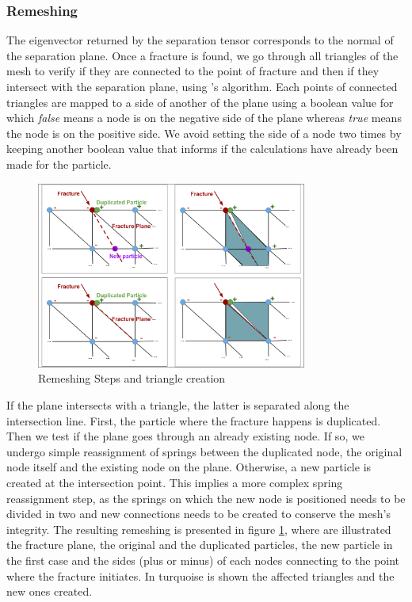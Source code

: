 \documentclass[tog]{acmsiggraph}
\begin{document}
\subsubsection{Remeshing}
The eigenvector returned by the separation tensor corresponds to the normal of the separation plane. Once a fracture is found, we go through all triangles of the mesh to verify if they are connected to the point of fracture and then if they intersect with the separation plane, using \cite{Inters}'s algorithm. Each points of connected triangles are mapped to a side of another of the plane using a boolean value for which \textit{false} means a node is on the negative side of the plane whereas \textit{true} means the node is on the positive side. We avoid setting the side of a node two times by keeping another boolean value that informs if the calculations have already been made for the particle. 

\begin{figure}[ht]
  \centering
  \includegraphics[width=3.5in]{images/fractures}
  \caption{Remeshing Steps and triangle creation}
  \label{fig:remeshing}
\end{figure}

If the plane intersects with a triangle, the latter is separated along the intersection line. First, the particle where the fracture happens is duplicated. Then we test if the plane goes through an already existing node. If so, we undergo simple reassignment of springs between the duplicated node, the original node itself and the existing node on the plane. Otherwise, a new particle is created at the intersection point. This implies a more complex spring reassignment step, as the springs on which the new node is positioned needs to be divided in two and new connections needs to be created to conserve the mesh's integrity. The resulting remeshing is presented in figure \ref{fig:remeshing}, where are illustrated the fracture plane, the original and the duplicated particles, the new particle in the first case and the sides (plus or minus) of each nodes connecting to the point where the fracture initiates. In turquoise is shown the affected triangles and the new ones created. 
\end{document}
